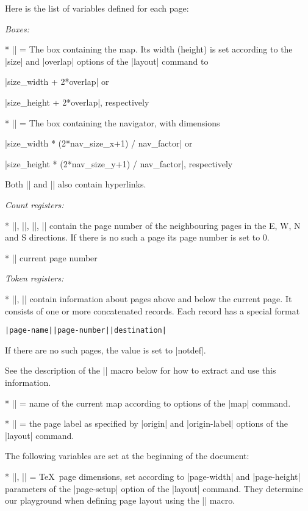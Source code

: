 Here is the list of variables defined for each page:

\list
  {\it Boxes:}

  * |\mapbox| = The box containing the map. Its width (height) is set 
    according to the |size| and |overlap| options of the |layout| command to 

    |size_width + 2*overlap| or 
    
    |size_height + 2*overlap|, respectively

  * |\navbox| = The box containing the navigator, with dimensions

    |size_width * (2*nav_size_x+1) / nav_factor| or

    |size_height * (2*nav_size_y+1) / nav_factor|, respectively

    Both |\mapbox| and |\navbox| also contain hyperlinks.

  {\it Count registers:}

  * |\pointerE|, |\pointerW|, |\pointerN|, |\pointerS| contain the page number 
    of the neighbouring pages in the E, W, N and S directions. If there is no 
    such a page its page number is set to 0.

  * |\pagenum| current page number

  {\it Token registers:}

  * |\pointerU|, |\pointerD| contain information about pages above and below
    the current page. It consists of one or more concatenated records. Each 
    record has a special format
    
    {\tt|page-name||page-number||destination|}
    
    If there are no such pages, the value is set to |notdef|.

    See the description of the |\processpointeritem| macro below for how to 
    extract and use this information.

  * |\pagename| = name of the current map according to options of the |map|
    command.

  * |\pagelabel| = the page label as specified by |origin| and |origin-label|
    options of the |layout| command.
\endlist


The following variables are set at the beginning of the document:

\list
  * |\hsize|, |\vsize| = \TeX\ page dimensions, set according to |page-width|
    and |page-height| parameters of the |page-setup| option of the |layout|
    command. They determine our playground when defining page layout using 
    the |\dopage| macro.

